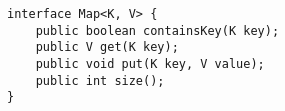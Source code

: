 \begin{lstlisting}
interface Map<K, V> {
    public boolean containsKey(K key);
    public V get(K key);
    public void put(K key, V value);
    public int size();
}
\end{lstlisting}